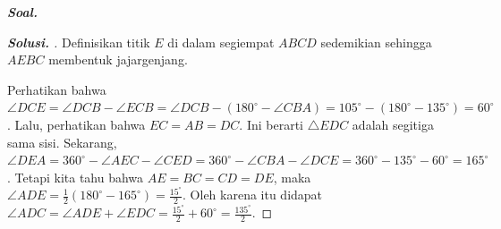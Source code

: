 \textbf{\textit{Soal. }}

\begin{proof}[\textbf{Solusi. }] Definisikan titik $E$ di dalam segiempat $ABCD$ sedemikian sehingga $AEBC$ membentuk jajargenjang.
% 

Perhatikan bahwa $\angle DCE = \angle DCB - \angle ECB = \angle DCB - (180^\circ - \angle CBA) = 105^\circ - (180^\circ - 135^\circ) = 60^\circ$. Lalu, perhatikan bahwa $EC=AB=DC$. Ini berarti $\triangle EDC$ adalah segitiga sama sisi. Sekarang, $\angle DEA = 360^\circ - \angle AEC - \angle CED = 360^\circ - \angle CBA - \angle DCE = 360^\circ - 135^\circ - 60^\circ = 165^\circ$. Tetapi kita tahu bahwa $AE=BC=CD=DE$, maka $\angle ADE = \frac{1}{2}(180^\circ-165^\circ)=\frac{15^\circ}{2}$. Oleh karena itu didapat $\angle ADC = \angle ADE + \angle EDC = \frac{15^\circ}{2}+60^\circ = \frac{135^\circ}{2}$.
\end{proof}
